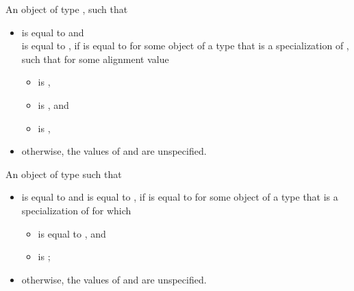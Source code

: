 \documentclass{wg21}
\begin{document}
\begin{itemdescr}
\begin{removedblock}
\pnum
\returns
An object  of type , such that
\begin{itemize}
\item
{} is equal to  and\\
 is equal to ,
if  is equal to 
for some object  of a type that is a specialization of ,
such that for some alignment value 
\begin{itemize}
\item {} is ,
\item {} is , and
\item {} is ,
\end{itemize}
\item
otherwise, the values of  and  are unspecified.
\end{itemize}
\end{removedblock}

\begin{addedblock}
\pnum
\returns
An object  of type  such that
\begin{itemize}
\item
{} is equal to
 and
 is equal to ,
if  is equal to 
for some object  of a type 
that is a specialization of  for which
\begin{itemize}
\item {} is equal to , and
\item {} is ;
\end{itemize}
\item
otherwise, the values of  and  are unspecified.
\end{itemize}
\end{addedblock}
\end{itemdescr}
\end{document}
